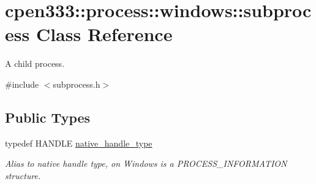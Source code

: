 \hypertarget{classcpen333_1_1process_1_1windows_1_1subprocess}{}\section{cpen333\+:\+:process\+:\+:windows\+:\+:subprocess Class Reference}
\label{classcpen333_1_1process_1_1windows_1_1subprocess}


A child process.  




{\ttfamily \#include $<$subprocess.\+h$>$}

\subsection*{Public Types}
\begin{DoxyCompactItemize}
\item 
\mbox{\label{classcpen333_1_1process_1_1windows_1_1subprocess_ac53f61176d4a9e02f8bd558995d56b4d}} 
typedef H\+A\+N\+D\+LE \hyperlink{classcpen333_1_1process_1_1windows_1_1subprocess_ac53f61176d4a9e02f8bd558995d56b4d}{native\+\_\+handle\+\_\+type}
\begin{DoxyCompactList}\small\item\em Alias to native handle type, on Windows is a P\+R\+O\+C\+E\+S\+S\+\_\+\+I\+N\+F\+O\+R\+M\+A\+T\+I\+ON structure. \end{DoxyCompactList}\end{DoxyCompactItemize}
